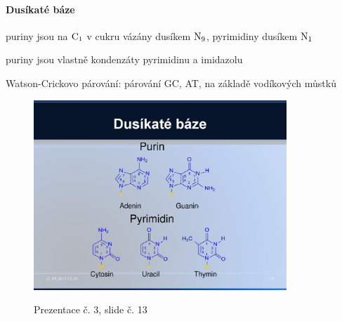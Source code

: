 \documentclass[DIV=8]{scrreprt}
\begin{document}
\paragraph{Dusíkaté báze}
\begin{myItemize}[nosep]
    \item puriny jsou na \(\ce{C1}\) v cukru vázány dusíkem \(\ce{N9}\), pyrimidiny dusíkem \(\ce{N1}\)
\begin{myItemize}[nosep]
    \item puriny jsou vlastně kondenzáty pyrimidinu a imidazolu
\end{myItemize}

    \item Watson-Crickovo párování: párování GC, AT, na základě vodíkových můstků \begin{figure}
    \caption{Prezentace č. 3, slide č. 13}
    \includegraphics[width=0.85\textwidth]{slides-3/slide-13.jpg}
    \centering
    \label{slides-3-slide-13}
\end{figure}


\end{myItemize}
\end{document}
